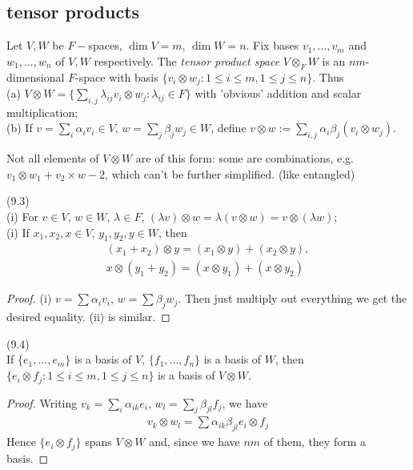 \documentclass[a4paper]{article}
\begin{document}
\subsection{tensor products}
Let $V,W$ be $F-$spaces, $\dim V = m$, $\dim W = n$. Fix bases $v_1,...,v_m$ and $w_1,...,w_n$ of $V,W$ respectively. The \emph{tensor product space} $V \otimes_F W$ is an $nm$-dimensional $F$-space with basis $\{v_i \otimes w_j: 1 \leq i \leq m, 1 \leq j \leq n\}$. Thus\\
(a) $V \otimes W = \{\sum_{i,j} \lambda_{ij} v_i \otimes w_j: \lambda_{ij} \in F\}$ with 'obvious' addition and scalar multiplication;\\
(b) If $v = \sum_{i} \alpha_iv_i \in V$, $w = \sum_j \beta_j w_j \in W$, define $v\otimes w:=\sum_{i,j} \alpha_i\beta_j (v_i\otimes w_j)$.

\begin{rem}
Not all elements of $V \otimes W$ are of this form: some are combinations, e.g. $v_1 \otimes w_1 + v_2 \times w-2$, which can't be further simplified. (like entangled)
\end{rem}

\begin{lemma} (9.3)\\
(i) For $v \in V$, $w \in W$, $\lambda \in F$, $(\lambda v) \otimes w = \lambda (v\otimes w) = v \otimes (\lambda w)$;\\
(i) If $x_1,x_2,x \in V$, $y_1,y_2,y \in W$, then 
\begin{equation*}
\begin{aligned}
(x_1+x_2) \otimes y = (x_1 \otimes y) + (x_2 \otimes y),\\
x \otimes (y_1+y_2) = (x \otimes y_1) + (x \otimes y_2)
\end{aligned}
\end{equation*}
\begin{proof}
(i) $v = \sum \alpha_i v_i$, $w = \sum \beta_j w_j$. Then just multiply out everything we get the desired equality. (ii) is similar.
\end{proof}
\end{lemma}

\begin{lemma} (9.4)\\
If $\{e_1,...,e_m\}$ is a basis of $V$, $\{f_1,...,f_n\}$ is a basis of $W$, then $\{e_i \otimes f_j: 1 \leq i \leq m,1 \leq j \leq n\}$ is a basis of $V \otimes W$.
\begin{proof}
Writing $v_k = \sum_i \alpha_{ik} e_i$, $w_l = \sum_j \beta_{jl} f_j$, we have
\begin{equation*}
\begin{aligned}
v_k \otimes w_l = \sum \alpha_{ik} \beta_{jl} e_i \otimes f_j
\end{aligned}
\end{equation*}
Hence $\{e_i \otimes f_j\}$ spans $V \otimes W$ and, since we have $nm$ of them, they form a basis.
\end{proof}
\end{lemma}
\end{document}
